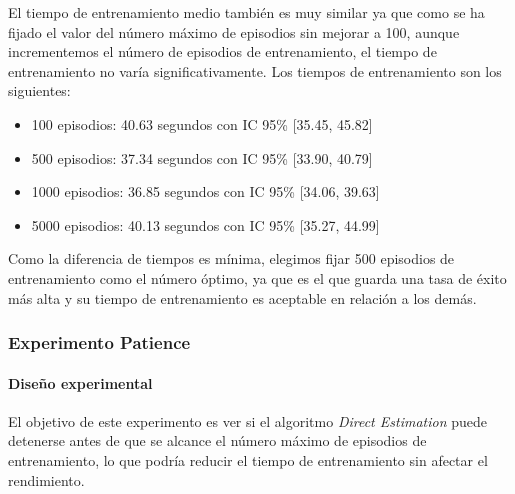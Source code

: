 El tiempo de entrenamiento medio también es muy similar ya que como se ha fijado el valor del número máximo de episodios sin mejorar a 100, aunque incrementemos el número de episodios de entrenamiento, el tiempo de entrenamiento no varía significativamente. Los tiempos de entrenamiento son los siguientes:
\begin{itemize}
    \item 100 episodios: 40.63 segundos con IC 95\% [35.45,  45.82]
    \item 500 episodios: 37.34 segundos con IC 95\% [33.90,  40.79]
    \item 1000 episodios: 36.85 segundos con IC 95\% [34.06,  39.63]
    \item 5000 episodios: 40.13 segundos con IC 95\% [35.27,  44.99]
\end{itemize}

Como la diferencia de tiempos es mínima, elegimos fijar 500 episodios de entrenamiento como el número óptimo, ya que es el que guarda una tasa de éxito más alta y su tiempo de entrenamiento es aceptable en relación a los demás.

\subsubsection{Experimento Patience}

\paragraph{Diseño experimental}

El objetivo de este experimento es ver si el algoritmo \textit{Direct Estimation} puede detenerse antes de que se alcance el número máximo de episodios de entrenamiento, lo que podría reducir el tiempo de entrenamiento sin afectar el rendimiento.

